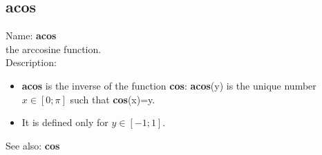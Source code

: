 \subsection{ acos }
\noindent Name: \textbf{acos}\\
the arccosine function.\\

\noindent Description: \begin{itemize}

\item \textbf{acos} is the inverse of the function \textbf{cos}: \textbf{acos}(y) is the unique number 
   $x \in [0; \pi]$ such that \textbf{cos}(x)=y.

\item It is defined only for $y \in [-1;1]$.
\end{itemize}
See also: \textbf{cos}
